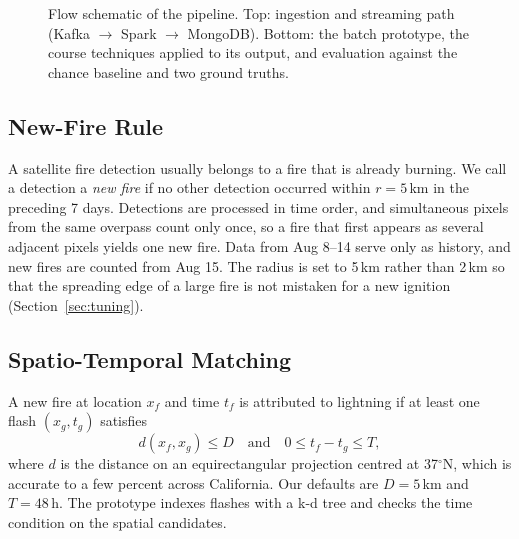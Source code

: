 \documentclass[10pt,journal,compsoc]{IEEEtran}
\begin{document}
\begin{figure}[!t]
\caption{Flow schematic of the pipeline. Top: ingestion and streaming path (Kafka $\rightarrow$ Spark $\rightarrow$ MongoDB). Bottom: the batch prototype, the course techniques applied to its output, and evaluation against the chance baseline and two ground truths.}
\label{fig:flow}
\end{figure}

\subsection{New-Fire Rule}
A satellite fire detection usually belongs to a fire that is already burning. We call a detection a \emph{new fire} if no other detection occurred within $r = 5$\,km in the preceding 7 days. Detections are processed in time order, and simultaneous pixels from the same overpass count only once, so a fire that first appears as several adjacent pixels yields one new fire. Data from Aug 8--14 serve only as history, and new fires are counted from Aug 15. The radius is set to 5\,km rather than 2\,km so that the spreading edge of a large fire is not mistaken for a new ignition (Section~\ref{sec:tuning}).

\subsection{Spatio-Temporal Matching}
A new fire at location $x_f$ and time $t_f$ is attributed to lightning if at least one flash $(x_g, t_g)$ satisfies
\begin{equation}
d(x_f, x_g) \le D \quad\text{and}\quad 0 \le t_f - t_g \le T,
\end{equation}
where $d$ is the distance on an equirectangular projection centred at 37$^\circ$N, which is accurate to a few percent across California. Our defaults are $D = 5$\,km and $T = 48$\,h. The prototype indexes flashes with a k-d tree and checks the time condition on the spatial candidates.
\end{document}

